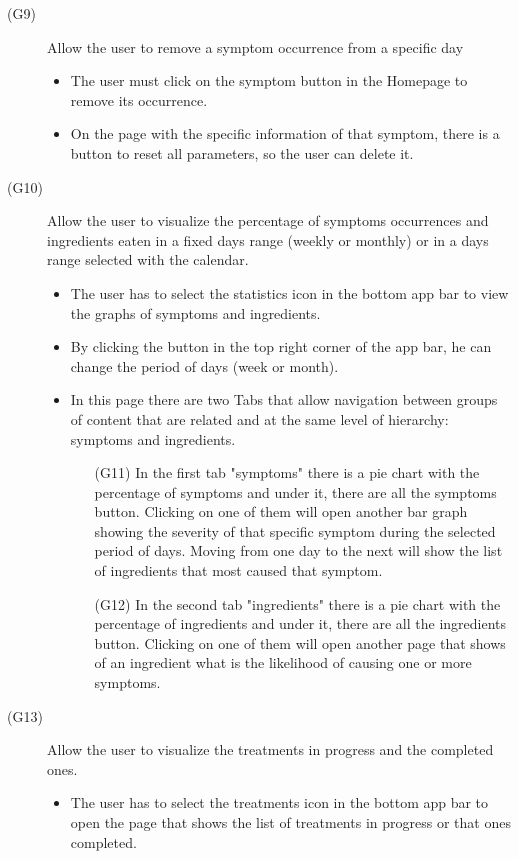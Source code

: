 \documentclass [12pt]{article}
\begin{document}
\begin{description}
\item[(G9)]Allow the user to remove a symptom occurrence from a specific day
\begin{itemize}
\item The user must click on the symptom button in the Homepage to remove its occurrence. 
\item On the page with the specific information of that symptom, there is a button to reset all parameters, so the user can delete it.
\end{itemize}
\end{description}

\begin{description}
\item[(G10)]Allow the user to visualize the percentage of symptoms occurrences and ingredients eaten in a fixed days range (weekly or monthly) or in a days range selected with the calendar.
\begin{itemize}
\item The user has to select the statistics icon in the bottom app bar to view the graphs of symptoms and ingredients. 
\item By clicking the button in the top right corner of the app bar, he can change the period of days (week or month). 
\item In this page there are two Tabs that allow navigation between groups of content that are related and at the same level of hierarchy: symptoms and ingredients.
\begin{itemize}[•]
\item[(G11)] In the first tab "symptoms" there is a pie chart with the percentage of symptoms and under it, there are all the symptoms button. Clicking on one of them will open another bar graph showing the severity of that specific symptom during the selected period of days. Moving from one day to the next will show the list of ingredients that most caused that symptom.
\item[(G12)] In the second tab "ingredients" there is a pie chart with the percentage of ingredients and under it, there are all the ingredients button. Clicking on one of them will open another page that shows of an ingredient what is the likelihood of causing one or more symptoms.
\end{itemize}
\end{itemize}
\end{description}

\begin{description}
\item[(G13)]Allow the user to visualize the treatments in progress and the completed ones.
\begin{itemize}
\item The user has to select the treatments icon in the bottom app bar to open the page that shows the list of treatments in progress or that ones completed.  
\end{itemize}
\end{description}
\end{document}
